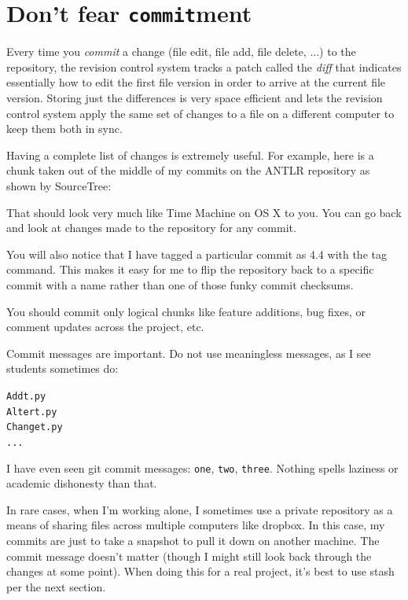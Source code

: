 \documentclass[titlepage]{tufte-book}
\begin{document}
\section{Don't fear {\tt commit}ment}

Every time you {\em commit} a change (file edit, file add, file delete, ...) to the repository, the revision control system tracks a patch called the {\em diff} that indicates essentially how to edit the first file version in order to arrive at the current file version. Storing just the differences is very space efficient and  lets the revision control system apply the same set of changes to a file on a different computer to keep them both in sync.  

Having a complete list of changes is extremely useful. For example, here is a chunk taken out of the middle of my commits on the ANTLR repository as shown by SourceTree:


That should look very much like Time Machine on OS X to you. You can go back and look at changes made to the repository for any commit.

You will also notice that I have tagged a particular commit as 4.4 with the tag command. This makes it easy for me to flip the repository back to a specific commit with a name rather than one of those funky commit checksums.

You should commit only logical chunks like feature additions, bug fixes, or comment updates across the project, etc.

Commit messages are important. Do not use meaningless messages, as I see students sometimes do:

\begin{alltt}
Add t.py
Alter t.py
Change t.py
...
\end{alltt}

I have even seen git commit messages: {\tt one}, {\tt two}, {\tt three}. Nothing spells laziness or academic dishonesty than that.

In rare cases, when I'm working alone, I sometimes use a private repository as a means of sharing files across multiple computers like dropbox. In this case, my commits are just to take a snapshot to pull it down on another machine. The commit message doesn't matter (though I might still look back through the changes at some point). When doing this for a real project, it's best to use stash per the next section.
\end{document}

